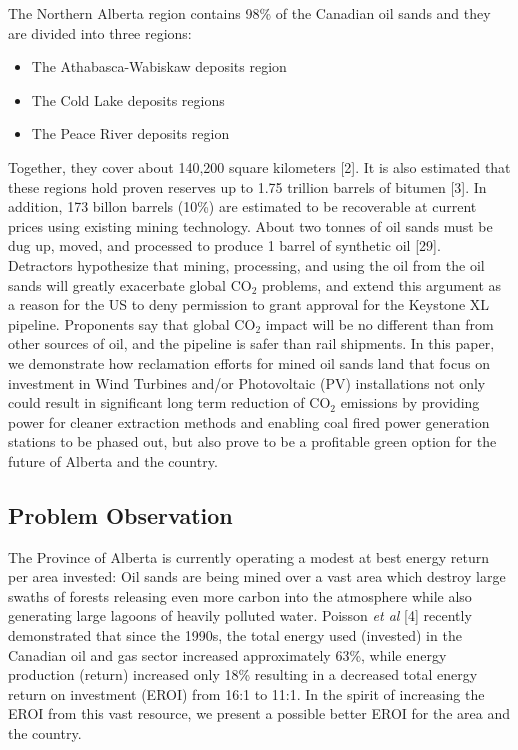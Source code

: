 \documentclass[12pt]{article}
\begin{document}
The Northern Alberta region contains 98\% of the Canadian oil sands and they are divided into three regions:
\begin{itemize}
\item The Athabasca-Wabiskaw deposits region
\item The Cold Lake deposits regions 
\item The Peace River deposits region
\end{itemize}

Together, they cover about 140,200 square kilometers [2]. It is also estimated that these regions hold proven reserves up to 1.75 trillion barrels of bitumen [3]. In addition, 173 billon barrels (10\%) are estimated to be recoverable at current prices using existing mining technology. About two tonnes of oil sands must be dug up, moved, and processed to produce 1 barrel of synthetic oil [29].  \\

Detractors hypothesize that mining, processing, and using the oil from the oil sands will greatly exacerbate global CO$_2$ problems, and extend this argument as a reason for the US to deny permission to grant approval for the Keystone XL pipeline. Proponents say that global CO$_2$ impact will be no different than from other sources of oil, and the pipeline is safer than rail shipments. In this paper, we demonstrate how reclamation efforts for mined oil sands land that focus on investment in Wind Turbines and/or Photovoltaic (PV) installations not only could result in significant long term reduction of CO$_2$ emissions by providing power for cleaner extraction methods and enabling coal fired power generation stations to be phased out, but also prove to be a profitable green option for the future of Alberta and the country. 

\subsection{Problem Observation}

The Province of Alberta is currently operating a modest at best energy return per area invested: Oil sands are being mined over a vast area which destroy large swaths of forests releasing even more carbon into the atmosphere while also generating large lagoons of heavily polluted water. Poisson \emph{et al } [4] recently demonstrated that since the 1990s, the total energy used (invested) in the Canadian oil and gas sector increased approximately 63\%, while energy production (return) increased only 18\% resulting in a decreased total energy return on investment (EROI) from 16:1 to 11:1.   In the spirit of increasing the EROI from this vast resource, we present a possible better EROI for the area and the country.  \\
\end{document}
